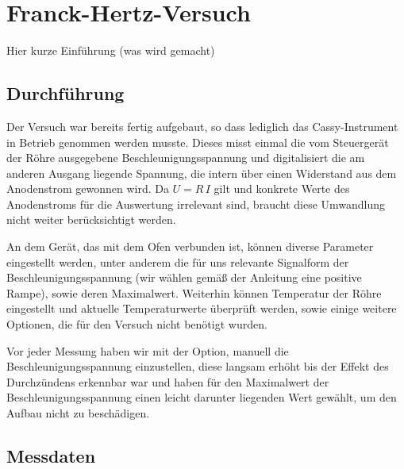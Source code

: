 \documentclass[11pt, a4paper]{article}
\begin{document}
\FloatBarrier

\section{Franck-Hertz-Versuch}
Hier kurze Einführung (was wird gemacht)

\subsection{Durchführung}

Der Versuch war bereits fertig aufgebaut, so dass lediglich das Cassy-Instrument in Betrieb genommen werden musste.
Dieses misst einmal die vom Steuergerät der Röhre ausgegebene Beschleunigungsspannung und digitalisiert die am anderen Ausgang liegende Spannung, die intern über einen Widerstand aus dem Anodenstrom gewonnen wird.
Da $U=R\,I$ gilt und konkrete Werte des Anodenstroms für die Auswertung irrelevant sind, braucht diese Umwandlung nicht weiter berücksichtigt werden.

An dem Gerät, das mit dem Ofen verbunden ist, können diverse Parameter eingestellt werden, unter anderem die für uns relevante Signalform der Beschleunigungsspannung (wir wählen gemäß der Anleitung eine positive Rampe), sowie deren Maximalwert.
Weiterhin können Temperatur der Röhre eingestellt und aktuelle Temperaturwerte überprüft werden, sowie einige weitere Optionen, die für den Versuch nicht benötigt wurden.

Vor jeder Messung haben wir mit der Option, manuell die Beschleunigungsspannung einzustellen, diese langsam erhöht bis der Effekt des Durchzündens erkennbar war und haben für den Maximalwert der Beschleunigungsspannung einen leicht darunter liegenden Wert gewählt, um den Aufbau nicht zu beschädigen.

\subsection{Messdaten}
\end{document}
